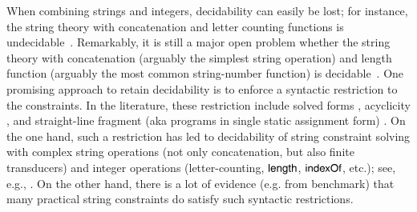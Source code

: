 When combining strings and integers, decidability can easily be lost; 
 for instance, the string theory with concatenation and letter counting
functions is undecidable~\cite{buchi,Manea-RP}.
Remarkably, it is still a major open problem whether the string theory with concatenation (arguably the simplest string operation) and length function 
(arguably the most common string-number function) is 
decidable~\cite{Vijay-length}. 
One promising approach to retain decidability is to enforce a syntactic
restriction to the constraints. In the  literature, these restriction  include solved forms
\cite{Vijay-length}, acyclicity \cite{BFL13,Abdulla14,AbdullaA+19}, and 
straight-line fragment (aka programs in single static assignment form) \cite{LB16,CCH+18,CHL+19,HJLRV18}. On the one hand,
such a restriction has led to decidability of string constraint solving with 
complex string
operations (not only concatenation, but also finite transducers) and integer
operations (letter-counting, $\mathsf{length}$, $\mathsf{indexOf}$, etc.); see, e.g., 
\cite{LB16}. On the other hand, there is a lot of evidence (e.g. from 
benchmark) that %
many practical string constraints do satisfy 
such syntactic restrictions.
%
%

